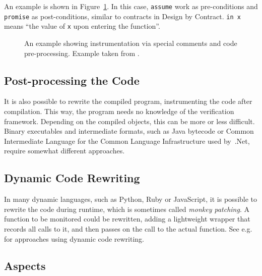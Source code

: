 \documentclass[a4paper,11pt]{kth-mag}
\theoremstyle{definition}
\begin{document}
An example is shown in Figure~\ref{figure-pre-processing-comments-example}. In
this case, \texttt{assume} work as pre-conditions and \texttt{promise} as
post-conditions, similar to contracts in Design by Contract. \texttt{in x}
means ``the value of \texttt{x} upon entering the function''.

\begin{figure}[h!]
	\begin{center}
	\begin{minipage}{0.7\textwidth}
    \lstset{language=C}
		
	\end{minipage}
	\end{center}
  \caption{An example showing instrumentation via special comments and code
    pre-processing. Example taken from \cite{rosenblum95practicalassertions}.}
	\label{figure-pre-processing-comments-example}
\end{figure}


\subsection{Post-processing the Code}

It is also possible to rewrite the compiled program, instrumenting the code
after compilation. This way, the program needs no knowledge of the verification
framework. Depending on the compiled objects, this can be more or less
difficult. Binary executables and intermediate formats, such as Java bytecode
or Common Intermediate Language for the Common Language Infrastructure used
by~.Net, require somewhat different approaches.


\subsection{Dynamic Code Rewriting}

In many dynamic languages, such as Python, Ruby or JavaScript, it is possible
to rewrite the code during runtime, which is sometimes called \textit{monkey
patching}. A function to be monitored could be rewritten, adding a lightweight
wrapper that records all calls to it, and then passes on the call to the actual
function. See e.g.\ \cite{matusiak09aoppy} for approaches using dynamic code
rewriting.


\subsection{Aspects} \label{section-aspects}
\end{document}
